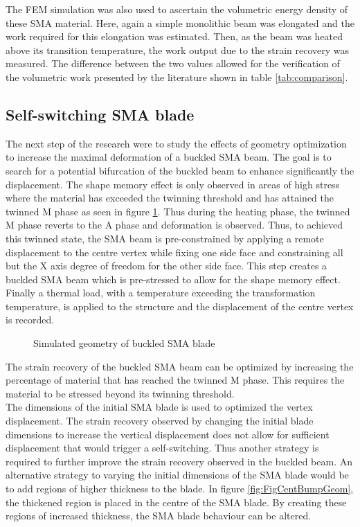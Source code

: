 The FEM simulation was also used to ascertain the volumetric energy density of these SMA material. Here, again a simple monolithic beam was elongated and the work required for this elongation was estimated. Then, as the beam was heated above its transition temperature, the work output due to the strain recovery was measured. The difference between the two values allowed for the verification of the volumetric work presented by the literature shown in table \ref{tab:comparison}.

\subsection{Self-switching SMA blade}
The next step of the research were to study the effects of geometry optimization to increase the maximal deformation of a buckled SMA beam. The goal is to search for a potential bifurcation of the buckled beam to enhance significantly the displacement. The shape memory effect is only observed in areas of high stress where the material has exceeded the twinning threshold and has attained the twinned M phase as seen in figure \ref{fig:FigSMABlade}. Thus during the heating phase, the twinned M phase reverts to the A phase and deformation is observed. Thus, to achieved this twinned state, the SMA beam is pre-constrained by applying a remote displacement to the centre vertex while fixing one side face and constraining all but the X axis degree of freedom for the other side face. This step creates a buckled SMA beam which is pre-stressed to allow for the shape memory effect. Finally a thermal load, with a temperature exceeding the transformation temperature, is applied to the structure and the displacement of the centre vertex is recorded.
\begin{figure}[H]
	\centering
	\def\svgwidth{0.5\textwidth}
	
	\caption{Simulated geometry of buckled SMA blade}
	\label{fig:FigSMABlade}
\end{figure}
The strain recovery of the buckled SMA beam can be optimized by increasing the percentage of material that has reached the twinned M phase. This requires the material to be stressed beyond its twinning threshold.\\

The dimensions of the initial SMA blade is used to optimized the vertex displacement. The strain recovery observed by changing the initial blade dimensions to increase the vertical displacement does not allow for sufficient displacement that would trigger a self-switching. Thus another strategy is required to further improve the strain recovery observed in the buckled beam. An alternative strategy to varying the initial dimensions of the SMA blade would be to add regions of higher thickness to the blade. In figure \ref{fig:FigCentBumpGeom}, the thickened region is placed in the centre of the SMA blade. By creating these regions of increased thickness, the SMA blade behaviour can be altered.

